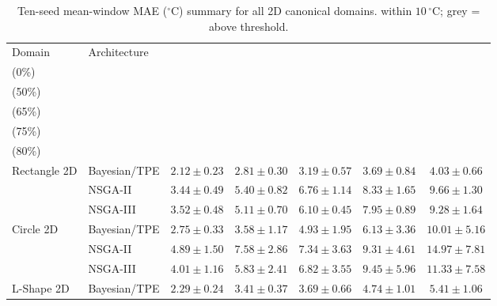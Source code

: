 \begin{table}[H]
\centering\small\setlength{\tabcolsep}{4pt}
\caption{Ten-seed mean-window MAE ($^\circ\mathrm{C}$) summary for all 2D canonical domains.
\phantom{x} within $10\,^\circ\mathrm{C}$;
{\color{gray!60!black}grey} = above threshold.}
\label{tab:summary_2d_mae}
\begin{tabular}{@{}llccccc@{}}
\toprule
Domain & Architecture
  & \makecell{$k{=}1$\\(0\%)} & \makecell{$k{=}2$\\(50\%)} & \makecell{$k{=}3$\\(65\%)} & \makecell{$k{=}4$\\(75\%)} & \makecell{$k{=}5$\\(80\%)} \\
\midrule
\multirow{3}{*}{Rectangle 2D}
  & Bayesian/TPE & \cellcolor{RoyalBlue!20}$2.12\pm0.23$ & \cellcolor{RoyalBlue!20}$2.81\pm0.30$ & \cellcolor{RoyalBlue!20}$3.19\pm0.57$ & \cellcolor{RoyalBlue!20}$3.69\pm0.84$ & \cellcolor{RoyalBlue!20}$4.03\pm0.66$ \\
  & NSGA-II      & \cellcolor{RoyalBlue!20}$3.44\pm0.49$ & \cellcolor{RoyalBlue!20}$5.40\pm0.82$ & \cellcolor{RoyalBlue!20}$6.76\pm1.14$ & \cellcolor{RoyalBlue!20}$8.33\pm1.65$ & \cellcolor{RoyalBlue!20}$9.66\pm1.30$ \\
  & NSGA-III     & \cellcolor{RoyalBlue!20}$3.52\pm0.48$ & \cellcolor{RoyalBlue!20}$5.11\pm0.70$ & \cellcolor{RoyalBlue!20}$6.10\pm0.45$ & \cellcolor{RoyalBlue!20}$7.95\pm0.89$ & \cellcolor{RoyalBlue!20}$9.28\pm1.64$ \\
\midrule
\multirow{3}{*}{Circle 2D}
  & Bayesian/TPE & \cellcolor{RoyalBlue!20}$2.75\pm0.33$ & \cellcolor{RoyalBlue!20}$3.58\pm1.17$ & \cellcolor{RoyalBlue!20}$4.93\pm1.95$ & \cellcolor{RoyalBlue!20}$6.13\pm3.36$ & {\color{gray!60!black}$10.01\pm5.16$} \\
  & NSGA-II      & \cellcolor{RoyalBlue!20}$4.89\pm1.50$ & \cellcolor{RoyalBlue!20}$7.58\pm2.86$ & \cellcolor{RoyalBlue!20}$7.34\pm3.63$ & \cellcolor{RoyalBlue!20}$9.31\pm4.61$ & {\color{gray!60!black}$14.97\pm7.81$} \\
  & NSGA-III     & \cellcolor{RoyalBlue!20}$4.01\pm1.16$ & \cellcolor{RoyalBlue!20}$5.83\pm2.41$ & \cellcolor{RoyalBlue!20}$6.82\pm3.55$ & \cellcolor{RoyalBlue!20}$9.45\pm5.96$ & {\color{gray!60!black}$11.33\pm7.58$} \\
\midrule
\multirow{3}{*}{L-Shape 2D}
  & Bayesian/TPE & \cellcolor{RoyalBlue!20}$2.29\pm0.24$ & \cellcolor{RoyalBlue!20}$3.41\pm0.37$ & \cellcolor{RoyalBlue!20}$3.69\pm0.66$ & \cellcolor{RoyalBlue!20}$4.74\pm1.01$ & \cellcolor{RoyalBlue!20}$5.41\pm1.06$ \\

\end{tabular}
\end{table}
